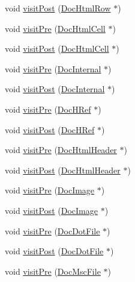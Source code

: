 \begin{DoxyCompactItemize}
void \hyperlink{class_latex_doc_visitor_a8f34ed8920ae1e3c76a2acabdb687c13}{visit\+Post} (\hyperlink{class_doc_html_row}{Doc\+Html\+Row} $\ast$)
\item 
void \hyperlink{class_latex_doc_visitor_a38f5793acafc46074f48640bfd4599c2}{visit\+Pre} (\hyperlink{class_doc_html_cell}{Doc\+Html\+Cell} $\ast$)
\item 
void \hyperlink{class_latex_doc_visitor_a30abd7211fb9ea1d1cddac8a53bc2d48}{visit\+Post} (\hyperlink{class_doc_html_cell}{Doc\+Html\+Cell} $\ast$)
\item 
void \hyperlink{class_latex_doc_visitor_a5583e408286ce93c634a2a7393eb0817}{visit\+Pre} (\hyperlink{class_doc_internal}{Doc\+Internal} $\ast$)
\item 
void \hyperlink{class_latex_doc_visitor_abd776129c88aad6e5fa4faff44c17127}{visit\+Post} (\hyperlink{class_doc_internal}{Doc\+Internal} $\ast$)
\item 
void \hyperlink{class_latex_doc_visitor_a4a396b7d76b24de9891349b0bb34db9e}{visit\+Pre} (\hyperlink{class_doc_h_ref}{Doc\+H\+Ref} $\ast$)
\item 
void \hyperlink{class_latex_doc_visitor_aea2fac973ab56b6107faec8a0d61b9ef}{visit\+Post} (\hyperlink{class_doc_h_ref}{Doc\+H\+Ref} $\ast$)
\item 
void \hyperlink{class_latex_doc_visitor_a9b7924869d3debb2b993fdbced303172}{visit\+Pre} (\hyperlink{class_doc_html_header}{Doc\+Html\+Header} $\ast$)
\item 
void \hyperlink{class_latex_doc_visitor_a046130adbfdc705c22a3d3e80abc15e2}{visit\+Post} (\hyperlink{class_doc_html_header}{Doc\+Html\+Header} $\ast$)
\item 
void \hyperlink{class_latex_doc_visitor_a708e42efc352409c4c941184f4ab18cf}{visit\+Pre} (\hyperlink{class_doc_image}{Doc\+Image} $\ast$)
\item 
void \hyperlink{class_latex_doc_visitor_a34b80b8009a54a94385557b40324dbf2}{visit\+Post} (\hyperlink{class_doc_image}{Doc\+Image} $\ast$)
\item 
void \hyperlink{class_latex_doc_visitor_a8cebbc5a749db195d521c227fb0cff63}{visit\+Pre} (\hyperlink{class_doc_dot_file}{Doc\+Dot\+File} $\ast$)
\item 
void \hyperlink{class_latex_doc_visitor_ae44ff2cb4653e6373cc3d916ba715b5f}{visit\+Post} (\hyperlink{class_doc_dot_file}{Doc\+Dot\+File} $\ast$)
\item 
void \hyperlink{class_latex_doc_visitor_adb5df8dd1d8309af71c833b1f13de3a8}{visit\+Pre} (\hyperlink{class_doc_msc_file}{Doc\+Msc\+File} $\ast$)

\end{DoxyCompactItemize}
